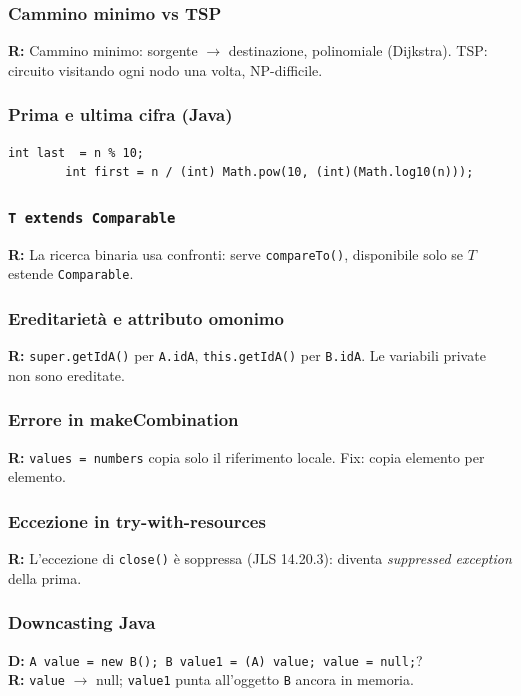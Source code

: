 \documentclass[a4paper, 11pt]{article}
\theoremstyle{definition}
\theoremstyle{remark}
\theoremstyle{remark}
\begin{document}
	\subsubsection*{Cammino minimo vs TSP}
	\textbf{R:} Cammino minimo: sorgente $\to$ destinazione, polinomiale
	(Dijkstra). TSP: circuito visitando ogni nodo una volta, NP-difficile.
	
	\subsubsection*{Prima e ultima cifra (Java)}
	\begin{lstlisting}[basicstyle=\ttfamily\footnotesize]
		int last  = n % 10;
		int first = n / (int) Math.pow(10, (int)(Math.log10(n)));
	\end{lstlisting}
	
	\subsubsection*{\texorpdfstring{\texttt{T extends Comparable}}%
		{T extends Comparable}}
	\textbf{R:} La ricerca binaria usa confronti: serve \texttt{compareTo()},
	disponibile solo se $T$ estende \texttt{Comparable}.
	
	\subsubsection*{Ereditarietà e attributo omonimo}
	\textbf{R:} \texttt{super.getIdA()} per \texttt{A.idA},
	\texttt{this.getIdA()} per \texttt{B.idA}.
	Le variabili private non sono ereditate.
	
	\subsubsection*{Errore in makeCombination}
	\textbf{R:} \texttt{values = numbers} copia solo il riferimento locale.
	Fix: copia elemento per elemento.
	
	\subsubsection*{Eccezione in try-with-resources}
	\textbf{R:} L'eccezione di \texttt{close()} è soppressa (JLS 14.20.3):
	diventa \textit{suppressed exception} della prima.
	
	\subsubsection*{Downcasting Java}
	\textbf{D:} \texttt{A value = new B(); B value1 = (A) value; value = null;}?\\
	\textbf{R:} \texttt{value} $\to$ null; \texttt{value1} punta all'oggetto
	\texttt{B} ancora in memoria.
	
\end{document}
